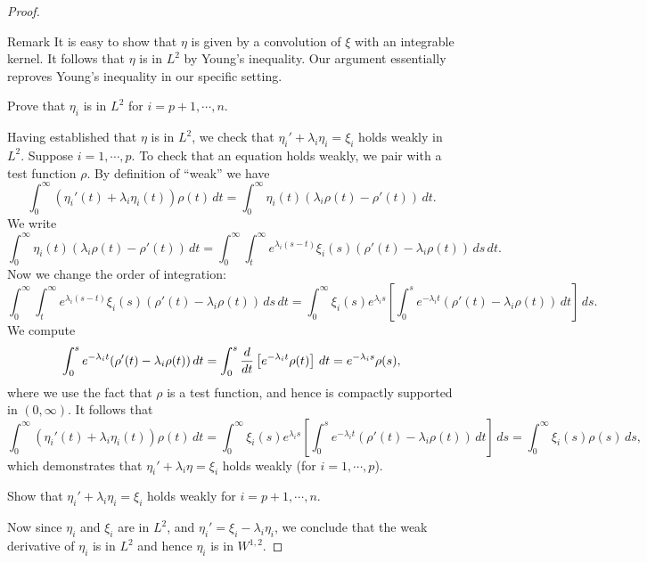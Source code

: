 \begin{proof}
  \begin{clear}{Remark}
    It is easy to show that $\eta$ is given by a convolution of $\xi$ with an integrable kernel. It follows that $\eta$ is in $L^{2}$ by Young's inequality. Our argument essentially reproves Young's inequality in our specific setting. 
  \end{clear}

  \begin{xca}
    Prove that $\eta_{i}$ is in $L^{2}$ for $i=p+1,\cdots,n$.   
  \end{xca}

  Having established that $\eta$ is in $L^{2}$, we check that $\eta_{i}'+\lambda_{i}\eta_{i}=\xi_{i}$ holds weakly in $L^{2}$. Suppose $i=1,\cdots,p$. To check that an equation holds weakly, we pair with a test function $\rho$. By definition of ``weak'' we have
  \begin{equation*}
    \int_{0}^{\infty}(\eta_{i}'(t)+\lambda_{i}\eta_{i}(t))\rho(t)\,dt=\int_{0}^{\infty}\eta_{i}(t)(\lambda_{i}\rho(t)-\rho'(t))\,dt.
  \end{equation*}
  We write
  \begin{equation*}
    \int_{0}^{\infty}\eta_{i}(t)(\lambda_{i}\rho(t)-\rho'(t))\,dt=\int_{0}^{\infty}\int_{t}^{\infty}e^{\lambda_{i}(s-t)}\xi_{i}(s)(\rho'(t)-\lambda_{i}\rho(t))\,ds\,dt.
  \end{equation*}
  Now we change the order of integration:
  \begin{equation*}   \int_{0}^{\infty}\int_{t}^{\infty}e^{\lambda_{i}(s-t)}\xi_{i}(s)(\rho'(t)-\lambda_{i}\rho(t))\,ds\,dt=\int_{0}^{\infty}\xi_{i}(s)e^{\lambda_{i}s}\left[\int_{0}^{s}e^{-\lambda_{i}t}(\rho'(t)-\lambda_{i}\rho(t))\,dt\right]\,ds.
  \end{equation*}
  We compute
  \begin{equation*}
    \int_{0}^{s}e^{-\lambda_{i}t}(\rho'(t)-\lambda_{i}\rho(t))\,dt=\int_{0}^{s}\frac{d}{dt}\left[e^{-\lambda_{i}t}\rho(t)\right]\,dt=e^{-\lambda_{i}s}\rho(s),
  \end{equation*}
  where we use the fact that $\rho$ is a test function, and hence is compactly supported in $(0,\infty)$. It follows that
  \begin{equation*}
    \int_{0}^{\infty}(\eta_{i}'(t)+\lambda_{i}\eta_{i}(t))\rho(t)\,dt=\int_{0}^{\infty}\xi_{i}(s)e^{\lambda_{i}s}\left[\int_{0}^{s}e^{-\lambda_{i}t}(\rho'(t)-\lambda_{i}\rho(t))\,dt\right]\,ds=\int_{0}^{\infty}\xi_{i}(s)\rho(s)\,ds,
  \end{equation*}
  which demonstrates that $\eta_{i}'+\lambda_{i}\eta=\xi_{i}$ holds weakly (for $i=1,\cdots,p$).
  \begin{xca}
    Show that $\eta_{i}'+\lambda_{i}\eta_{i}=\xi_{i}$ holds weakly for $i=p+1,\cdots,n$.
  \end{xca}
  Now since $\eta_{i}$ and $\xi_{i}$ are in $L^{2}$, and $\eta_{i}'=\xi_{i}-\lambda_{i}\eta_{i}$, we conclude that the weak derivative of $\eta_{i}$ is in $L^{2}$ and hence $\eta_{i}$ is in $W^{1,2}$.


\end{proof}
